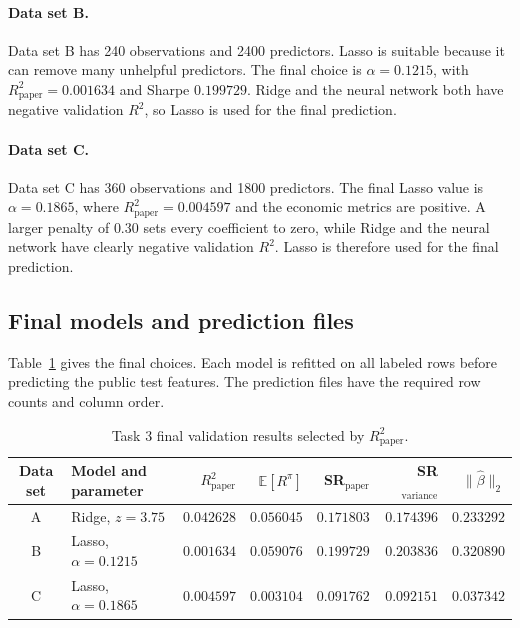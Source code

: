 \documentclass[11pt]{article}
\begin{document}
\paragraph{Data set B.}
Data set B has 240 observations and 2400 predictors. Lasso is suitable because
it can remove many unhelpful predictors. The final choice is
$\alpha=0.1215$, with $R^2_{\mathrm{paper}}=0.001634$ and Sharpe $0.199729$.
Ridge and the neural network both have negative validation $R^2$, so Lasso is
used for the final prediction.

\paragraph{Data set C.}
Data set C has 360 observations and 1800 predictors. The final Lasso value is
$\alpha=0.1865$, where $R^2_{\mathrm{paper}}=0.004597$ and the economic
metrics are positive. A larger penalty of $0.30$ sets every coefficient to
zero, while Ridge and the neural network have clearly negative validation
$R^2$. Lasso is therefore used for the final prediction.

\subsection{Final models and prediction files}

Table~\ref{tab:task3-validation} gives the final choices. Each model is refitted
on all labeled rows before predicting the public test features. The prediction
files have the required row counts and column order.

\begin{table}[htbp]
    \centering
    \small
    \caption{Task 3 final validation results selected by
    $R^2_{\mathrm{paper}}$.}
    \label{tab:task3-validation}
    \begin{tabular}{clrrrrr}
        \toprule
        Data set & Model and parameter & $R^2_{\mathrm{paper}}$
        & $\mathbb E[R^\pi]$ & SR$_{\mathrm{paper}}$
        & SR$_{\mathrm{variance}}$ & $\|\widehat\beta\|_2$ \\
        \midrule
        A & Ridge, $z=3.75$
        & $0.042628$ & $0.056045$ & $0.171803$ & $0.174396$ & $0.233292$ \\
        B & Lasso, $\alpha=0.1215$
        & $0.001634$ & $0.059076$ & $0.199729$ & $0.203836$ & $0.320890$ \\
        C & Lasso, $\alpha=0.1865$
        & $0.004597$ & $0.003104$ & $0.091762$ & $0.092151$ & $0.037342$ \\
        \bottomrule
    \end{tabular}
\end{table}
\end{document}
